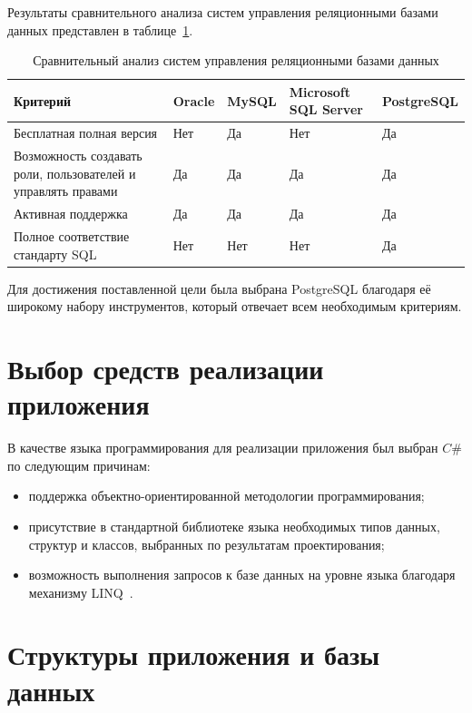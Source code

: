 \newpage

Результаты сравнительного анализа систем управления реляционными базами данных представлен в таблице~\ref{tbl:subd-compare}.

\begin{table}[h]
	\centering
	\caption{Сравнительный анализ систем управления реляционными базами данных}
	\label{tbl:subd-compare}
	\begin{tabularx}{\textwidth}{|p{3.5cm}|X|X|X|X|}
		\hline
		\textbf{Критерий} & \textbf{Oracle} & \textbf{MySQL} & \textbf{Microsoft SQL Server} & \textbf{PostgreSQL} \\
		\hline
		Бесплатная полная версия & Нет & Да & Нет & Да \\
		\hline
		Возможность создавать роли, пользователей и управлять правами & Да & Да & Да & Да \\
		\hline
		Активная поддержка & Да & Да & Да & Да \\
		\hline
		Полное соответствие стандарту SQL & Нет & Нет  & Нет & Да \\
		\hline
	\end{tabularx}
\end{table}

Для достижения поставленной цели была выбрана PostgreSQL благодаря её широкому набору инструментов, который отвечает всем необходимым критериям.

\section{Выбор средств реализации приложения}

В качестве языка программирования для реализации приложения был выбран $C\#$ по следующим причинам:
\begin{itemize}[label=--]
	\item поддержка объектно-ориентированной методологии программирования;
	\item присутствие в стандартной библиотеке языка необходимых типов данных, структур и классов, выбранных по результатам проектирования;
	\item возможность выполнения запросов к базе данных на уровне языка благодаря механизму LINQ~\cite{lit16}.
\end{itemize}

\section{Структуры приложения и базы данных}

